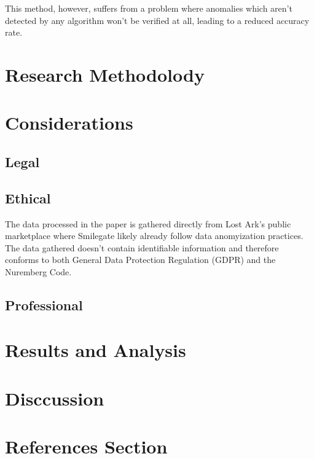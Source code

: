 \documentclass[journal]{IEEEtran}
\begin{document}
This method, however, suffers from a problem where anomalies which aren't detected by any algorithm won't be verified at all, leading to a reduced accuracy rate.

\section{Research Methodolody}

\section{Considerations}
\subsection{Legal}
\noindent 

\subsection{Ethical}
\noindent The data processed in the paper is gathered directly from Lost Ark's public marketplace where Smilegate likely already follow data anomyization practices\cite{Gruschka2018}. The data gathered doesn't contain identifiable information and therefore conforms to both General Data Protection Regulation (GDPR) and the Nuremberg Code\cite{Nuremberg1947}.

\subsection{Professional}
\noindent 

\section{Results and Analysis}
\noindent 

\section{Disccussion}
\noindent

\section{References Section}
\printbibliography
\end{document}
